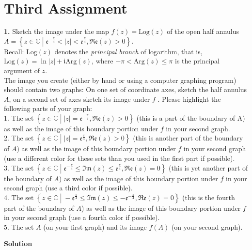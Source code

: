 \documentclass[11pt]{amsart}
\newcommand{\dsp}{\displaystyle}
\newcommand{\BBC}{\mathbb{C}}\newcommand{\mi}{\mathfrak{i}}
\begin{document}
\section{Third Assignment}
\textbf{1.} Sketch the image under the map $f(z)=\textrm{Log}(z)$ of the open half annulus 
$\dsp A=\left\{z\in\BBC\;\left| \;
\mathfrak{e}^{-\frac{\pi}{4}}<|z|<\mathfrak{e}^{\frac{\pi}{4}},\mathfrak{Re}
(z)>0\right.\right\} $.\\Recall: $\textrm{Log}(z)$ denotes the \textit{principal branch} 
of logarithm, that is, $\textrm{Log}(z)=\ln⁡|z|+\mi \textrm{Arg}(z)$, 
where $\dsp -\pi<\textrm{Arg}(z)\leq \pi$ is the principal argument of $z$.\\
The image you create (either by hand or using a computer graphing program) should contain two graphs: On one set of 
coordinate axes, sketch the half annulus $A$, on a second set of axes sketch its image 
under $f$ . Please highlight the following 
parts of your graph:\\
1. The set $\dsp \left\{z\in\BBC\;\left|\;|z| =\mathfrak{e}^{-\frac{\pi}{4}}, 
\mathfrak{Re}(z)>0\right.\right\}$ (this is a part of the boundary
of A) as well as the image of this boundary portion under $f$ in your second graph.\\
2. The set $\dsp \left\{z\in\BBC\;\left|\;|z| 
=\mathfrak{e}^{\frac{\pi}{4}},\mathfrak{Re}(z)>0\right.\right\}$ (this is another part of 
the 
boundary of $A$) as well as the image of this boundary portion under $f$ in your second 
graph (use a different color for these sets 
than you used in the first part if possible).\\
3. The set $\left\{z \in 
\BBC\;\left|\;\mathfrak{e}^{-\frac{\pi}{4}}\leq\mathfrak{Im}(z)\leq\mathfrak{e}^{\frac{\pi
} { 4 } }, \mathfrak{Re}(z)=0\right.\right\}$ (this is yet another part of the boundary 
of $A$) as well as the image of this 
boundary portion under $f$ in your second 
graph (use a third color if possible).\\
4. The set $\dsp \left\{z \in \BBC\;\left|\;-\mathfrak{e}^{\frac{\pi}{4}}\leq 
\mathfrak{Im}(z)\leq-\mathfrak{e}^{-\frac{\pi}{4}},
\mathfrak{Re}(z) = 0\right.\right\}$ (this is the fourth part of the boundary of $A$) as 
well 
as the image of this boundary portion under 
$f$ in your second graph (use a fourth color if possible).\\
5. The set $A$ (on your first graph) and its image $f(A)$ (on your second graph).
\begin{center}
\textbf{Solution}
\end{center}
\end{document}
